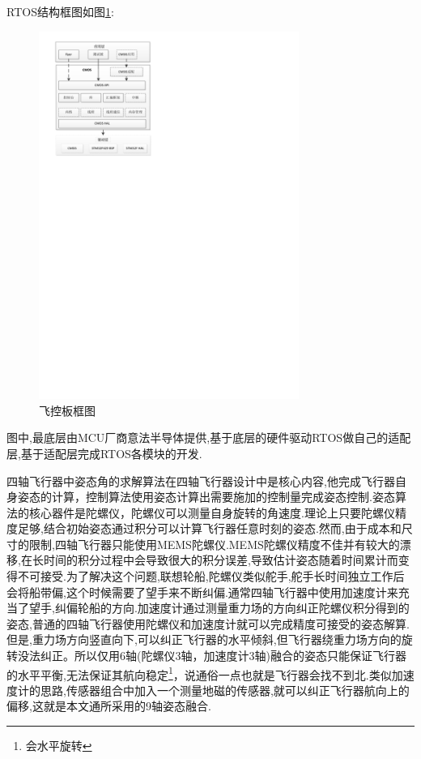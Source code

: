 \documentclass[10pt,a4paper]{article}
\begin{document}
RTOS结构框图如图\ref{cmos框图}:
\begin{figure}[!hbp]
    \begin{center}
        \includegraphics[height=12cm]{../../../../doc/CMOS结构框图.pdf}
        \caption{飞控板框图}\label{cmos框图}
    \end{center}
\end{figure}
图中,最底层由MCU厂商意法半导体提供,基于底层的硬件驱动RTOS做自己的适配层,基于适配层完成RTOS各模块的开发.

四轴飞行器中姿态角的求解算法在四轴飞行器设计中是核心内容,他完成飞行器自身姿态的计算，控制算法使用姿态计算出需要施加的控制量完成姿态控制.姿态算法的核心器件是陀螺仪，陀螺仪可以测量自身旋转的角速度.理论上只要陀螺仪精度足够,结合初始姿态通过积分可以计算飞行器任意时刻的姿态.然而,由于成本和尺寸的限制,四轴飞行器只能使用MEMS陀螺仪.MEMS陀螺仪精度不佳并有较大的漂移,在长时间的积分过程中会导致很大的积分误差,导致估计姿态随着时间累计而变得不可接受.为了解决这个问题,联想轮船,陀螺仪类似舵手,舵手长时间独立工作后会将船带偏,这个时候需要了望手来不断纠偏.通常四轴飞行器中使用加速度计来充当了望手,纠偏轮船的方向.加速度计通过测量重力场的方向纠正陀螺仪积分得到的姿态,普通的四轴飞行器使用陀螺仪和加速度计就可以完成精度可接受的姿态解算.但是,重力场方向竖直向下,可以纠正飞行器的水平倾斜,但飞行器绕重力场方向的旋转没法纠正。所以仅用6轴(陀螺仪3轴，加速度计3轴)融合的姿态只能保证飞行器的水平平衡,无法保证其航向稳定\footnote{会水平旋转}，说通俗一点也就是飞行器会找不到北.类似加速度计的思路,传感器组合中加入一个测量地磁的传感器,就可以纠正飞行器航向上的偏移,这就是本文通所采用的9轴姿态融合.
\end{document}
